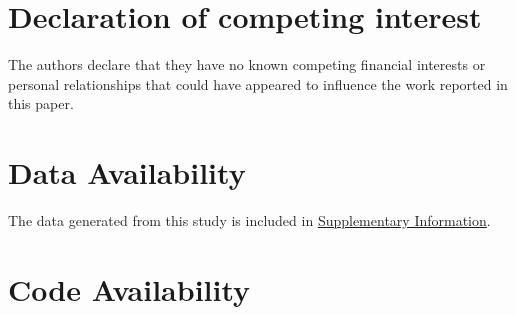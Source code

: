 \documentclass[letterpaper,4pt,times,preprint]{elsarticle}
\begin{document}

















\section*{Declaration of competing interest}

    The authors declare that they have no known competing financial interests or personal relationships that could have appeared to influence the work reported in this paper.

\section*{Data Availability}

    The data generated from this study is included in \underline{Supplementary Information}.

\section*{Code Availability}
\end{document}

